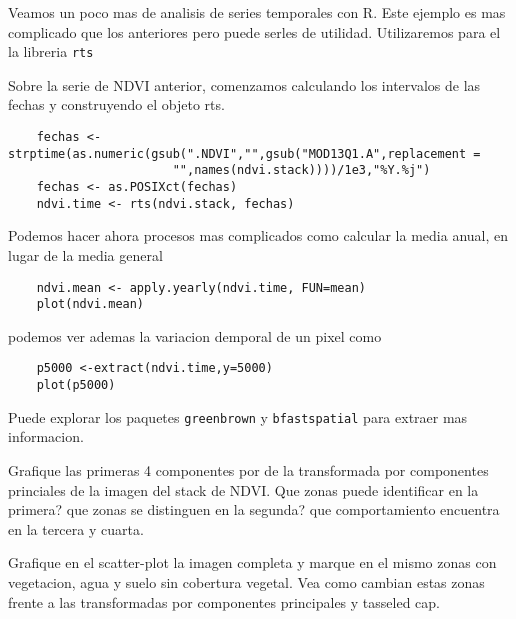 \begin{exa}
    Veamos un poco mas de analisis de series temporales con R. Este ejemplo es
    mas complicado que los anteriores pero puede serles de utilidad.
    Utilizaremos para el la libreria \texttt{rts}

    Sobre la serie de NDVI anterior, comenzamos calculando los intervalos de las
    fechas y construyendo el objeto rts.

    \begin{lstlisting}
    fechas <- strptime(as.numeric(gsub(".NDVI","",gsub("MOD13Q1.A",replacement =
                       "",names(ndvi.stack))))/1e3,"%Y.%j")
    fechas <- as.POSIXct(fechas)
    ndvi.time <- rts(ndvi.stack, fechas)
    \end{lstlisting}

    Podemos hacer ahora procesos mas complicados como calcular la media anual,
    en lugar de la media general
    \begin{lstlisting}
    ndvi.mean <- apply.yearly(ndvi.time, FUN=mean)
    plot(ndvi.mean)
    \end{lstlisting}
    podemos ver ademas la variacion demporal de un pixel como
    \begin{lstlisting}
    p5000 <-extract(ndvi.time,y=5000)
    plot(p5000)
    \end{lstlisting}
    Puede explorar los paquetes \texttt{greenbrown} y \texttt{bfastspatial} para
    extraer mas informacion.
\end{exa}

\begin{act}
    Grafique las primeras 4 componentes por de la transformada por componentes
    princiales de la imagen del stack de NDVI\@. Que zonas puede identificar en la
    primera? que zonas se distinguen en la segunda? que comportamiento encuentra
    en la tercera y cuarta.
\end{act}

\begin{act}
    Grafique en el scatter-plot la imagen completa y marque en el mismo zonas
    con vegetacion, agua y suelo sin cobertura vegetal. Vea como cambian estas
    zonas frente a las transformadas por componentes principales y tasseled cap.
\end{act}

